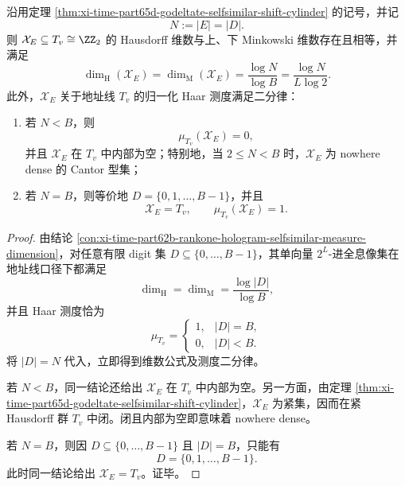 \begin{theorem}\label{thm:xi-time-part65d-godeltate-dimension-haar-dichotomy}
沿用定理 \ref{thm:xi-time-part65d-godeltate-selfsimilar-shift-cylinder} 的记号，并记
\[
N:=|E|=|D|.
\]
则 \(\mathcal X_E\subseteq T_v\cong \ZZ_2\) 的 Hausdorff 维数与上、下 Minkowski 维数存在且相等，并满足
\[
\dim_{\mathrm H}(\mathcal X_E)
=
\dim_{\mathrm M}(\mathcal X_E)
=
\frac{\log N}{\log B}
=
\frac{\log N}{L\log 2}.
\]
此外，\(\mathcal X_E\) 关于地址线 \(T_v\) 的归一化 Haar 测度满足二分律：
\begin{enumerate}
  \item 若 \(N<B\)，则
  \[
  \mu_{T_v}(\mathcal X_E)=0,
  \]
  并且 \(\mathcal X_E\) 在 \(T_v\) 中内部为空；特别地，当 \(2\le N<B\) 时，\(\mathcal X_E\) 为 nowhere dense 的 Cantor 型集；
  \item 若 \(N=B\)，则等价地 \(D=\{0,1,\dots,B-1\}\)，并且
  \[
  \mathcal X_E=T_v,
  \qquad
  \mu_{T_v}(\mathcal X_E)=1.
  \]
\end{enumerate}
\end{theorem}
\begin{proof}
由结论 \ref{con:xi-time-part62b-rankone-hologram-selfsimilar-measure-dimension}，对任意有限 digit 集 \(D\subseteq\{0,\dots,B-1\}\)，其单向量 \(2^L\)-进全息像集在地址线口径下都满足
\[
\dim_{\mathrm H}=\dim_{\mathrm M}=\frac{\log|D|}{\log B},
\]
并且 Haar 测度恰为
\[
\mu_{T_v}=
\begin{cases}
1,& |D|=B,\\
0,& |D|<B.
\end{cases}
\]
将 \(|D|=N\) 代入，立即得到维数公式及测度二分律。

若 \(N<B\)，同一结论还给出 \(\mathcal X_E\) 在 \(T_v\) 中内部为空。另一方面，由定理 \ref{thm:xi-time-part65d-godeltate-selfsimilar-shift-cylinder}，\(\mathcal X_E\) 为紧集，因而在紧 Hausdorff 群 \(T_v\) 中闭。闭且内部为空即意味着 nowhere dense。

若 \(N=B\)，则因 \(D\subseteq\{0,\dots,B-1\}\) 且 \(|D|=B\)，只能有
\[
D=\{0,1,\dots,B-1\}.
\]
此时同一结论给出 \(\mathcal X_E=T_v\)。证毕。
\end{proof}


